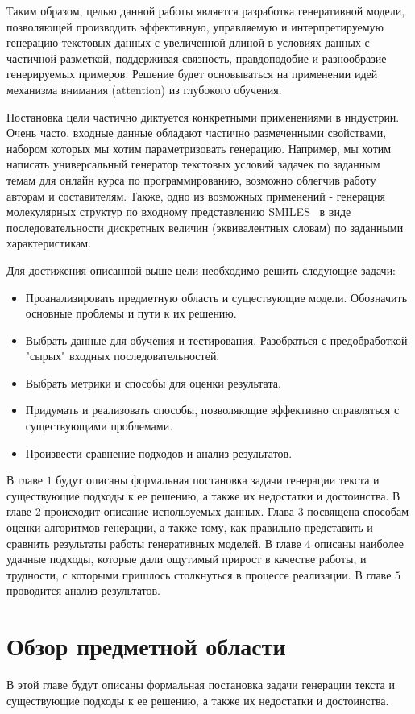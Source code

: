 \documentclass{spbau-diploma}
\begin{document}
Таким образом, целью данной работы является разработка генеративной модели, 
позволяющей производить эффективную, управляемую и интерпретируемую генерацию 
текстовых данных с увеличенной длиной в условиях данных с частичной разметкой, 
поддерживая связность, правдоподобие и разнообразие генерируемых примеров. 
Решение будет основываться на применении идей механизма внимания (attention) 
из глубокого обучения.

Постановка цели частично диктуется конкретными применениями в индустрии. 
Очень часто, входные данные обладают частично размеченными свойствами, набором
которых мы хотим параметризовать генерацию.
Например, мы хотим написать универсальный генератор текстовых условий задачек по 
заданным темам для онлайн курса по программированию, возможно облегчив работу 
авторам и составителям. Также, одно из возможных применений - генерация 
молекулярных структур по входному представлению SMILES~\cite{wiki:smiles} в виде 
последовательности дискретных величин (эквивалентных словам) по заданными 
характеристикам.

Для достижения описанной выше цели необходимо решить следующие задачи:
\begin{itemize}
    \item Проанализировать предметную область и существующие модели. Обозначить основные проблемы и пути к их решению.
    \item Выбрать данные для обучения и тестирования. Разобраться с предобработкой "сырых" входных последовательностей.
    \item Выбрать метрики и способы для оценки результата.
    \item Придумать и реализовать способы, позволяющие эффективно справляться с
    существующими проблемами.
    \item Произвести сравнение подходов и анализ результатов.
\end{itemize}

В главе $1$ будут описаны формальная постановка задачи генерации текста и 
существующие подходы к ее решению, а также их недостатки и достоинства. В главе
$2$ происходит описание используемых данных. Глава $3$ посвящена способам 
оценки алгоритмов генерации, а также тому, как правильно представить и сравнить 
результаты работы генеративных моделей. В главе $4$ описаны наиболее удачные 
подходы, которые дали ощутимый прирост в качестве работы, и трудности, с 
которыми пришлось столкнуться в процессе реализации. В главе $5$ проводится 
анализ результатов.

\section{Обзор предметной области}
В этой главе будут описаны формальная постановка задачи генерации текста и 
существующие подходы к ее решению, а также их недостатки и достоинства.
\end{document}
